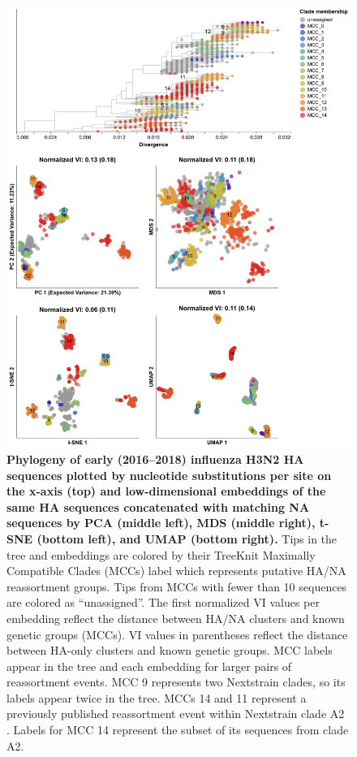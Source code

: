 \documentclass[webpdf,contemporary,large,single]{oup-authoring-template}%
\theoremstyle{thmstyleone}%
\theoremstyle{thmstyletwo}%
\theoremstyle{thmstylethree}%
\begin{document}
\begin{figure}[!h]
\includegraphics[width=0.9\columnwidth]{figures/flu-2016-2018-ha-na-embeddings-by-mcc.png}
\caption{{\bf Phylogeny of early (2016--2018) influenza H3N2 HA sequences plotted by nucleotide substitutions per site on the x-axis (top) and low-dimensional embeddings of the same HA sequences concatenated with matching NA sequences by PCA (middle left), MDS (middle right), t-SNE (bottom left), and UMAP (bottom right).}
  Tips in the tree and embeddings are colored by their TreeKnit Maximally Compatible Clades (MCCs) label which represents putative HA/NA reassortment groups.
  Tips from MCCs with fewer than 10 sequences are colored as ``unassigned''.
  The first normalized VI values per embedding reflect the distance between HA/NA clusters and known genetic groups (MCCs).
  VI values in parentheses reflect the distance between HA-only clusters and known genetic groups.
  MCC labels appear in the tree and each embedding for larger pairs of reassortment events.
  MCC 9 represents two Nextstrain clades, so its labels appear twice in the tree.
  MCCs 14 and 11 represent a previously published reassortment event within Nextstrain clade A2 \citep{Potter2019}.
  Labels for MCC 14 represent the subset of its sequences from clade A2.
}
\label{fig:seasonal-influenza-h3n2-ha-na-2016-2018-embeddings}
\end{figure}
\end{document}

